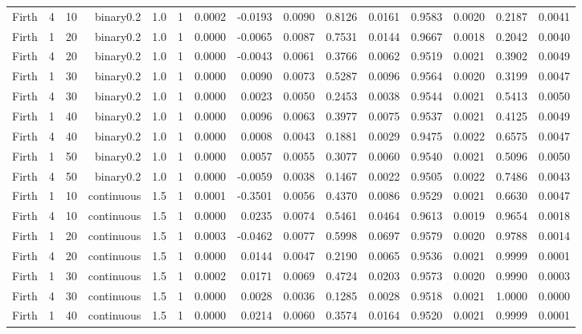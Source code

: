 \begin{longtable}{rrrrrrrrrrrrrrr}
  Firth & 4 & 10 & binary0.2 & 1.0 & 1 & 0.0002 & -0.0193 & 0.0090 & 0.8126 & 0.0161 & 0.9583 & 0.0020 & 0.2187 & 0.0041 \\ 
  Firth & 1 & 20 & binary0.2 & 1.0 & 1 & 0.0000 & -0.0065 & 0.0087 & 0.7531 & 0.0144 & 0.9667 & 0.0018 & 0.2042 & 0.0040 \\ 
  Firth & 4 & 20 & binary0.2 & 1.0 & 1 & 0.0000 & -0.0043 & 0.0061 & 0.3766 & 0.0062 & 0.9519 & 0.0021 & 0.3902 & 0.0049 \\ 
  Firth & 1 & 30 & binary0.2 & 1.0 & 1 & 0.0000 & 0.0090 & 0.0073 & 0.5287 & 0.0096 & 0.9564 & 0.0020 & 0.3199 & 0.0047 \\ 
  Firth & 4 & 30 & binary0.2 & 1.0 & 1 & 0.0000 & 0.0023 & 0.0050 & 0.2453 & 0.0038 & 0.9544 & 0.0021 & 0.5413 & 0.0050 \\ 
  Firth & 1 & 40 & binary0.2 & 1.0 & 1 & 0.0000 & 0.0096 & 0.0063 & 0.3977 & 0.0075 & 0.9537 & 0.0021 & 0.4125 & 0.0049 \\ 
  Firth & 4 & 40 & binary0.2 & 1.0 & 1 & 0.0000 & 0.0008 & 0.0043 & 0.1881 & 0.0029 & 0.9475 & 0.0022 & 0.6575 & 0.0047 \\ 
  Firth & 1 & 50 & binary0.2 & 1.0 & 1 & 0.0000 & 0.0057 & 0.0055 & 0.3077 & 0.0060 & 0.9540 & 0.0021 & 0.5096 & 0.0050 \\ 
  Firth & 4 & 50 & binary0.2 & 1.0 & 1 & 0.0000 & -0.0059 & 0.0038 & 0.1467 & 0.0022 & 0.9505 & 0.0022 & 0.7486 & 0.0043 \\ 
  Firth & 1 & 10 & continuous & 1.5 & 1 & 0.0001 & -0.3501 & 0.0056 & 0.4370 & 0.0086 & 0.9529 & 0.0021 & 0.6630 & 0.0047 \\ 
  Firth & 4 & 10 & continuous & 1.5 & 1 & 0.0000 & 0.0235 & 0.0074 & 0.5461 & 0.0464 & 0.9613 & 0.0019 & 0.9654 & 0.0018 \\ 
  Firth & 1 & 20 & continuous & 1.5 & 1 & 0.0003 & -0.0462 & 0.0077 & 0.5998 & 0.0697 & 0.9579 & 0.0020 & 0.9788 & 0.0014 \\ 
  Firth & 4 & 20 & continuous & 1.5 & 1 & 0.0000 & 0.0144 & 0.0047 & 0.2190 & 0.0065 & 0.9536 & 0.0021 & 0.9999 & 0.0001 \\ 
  Firth & 1 & 30 & continuous & 1.5 & 1 & 0.0002 & 0.0171 & 0.0069 & 0.4724 & 0.0203 & 0.9573 & 0.0020 & 0.9990 & 0.0003 \\ 
  Firth & 4 & 30 & continuous & 1.5 & 1 & 0.0000 & 0.0028 & 0.0036 & 0.1285 & 0.0028 & 0.9518 & 0.0021 & 1.0000 & 0.0000 \\ 
  Firth & 1 & 40 & continuous & 1.5 & 1 & 0.0000 & 0.0214 & 0.0060 & 0.3574 & 0.0164 & 0.9520 & 0.0021 & 0.9999 & 0.0001 \\ 

\end{longtable}
